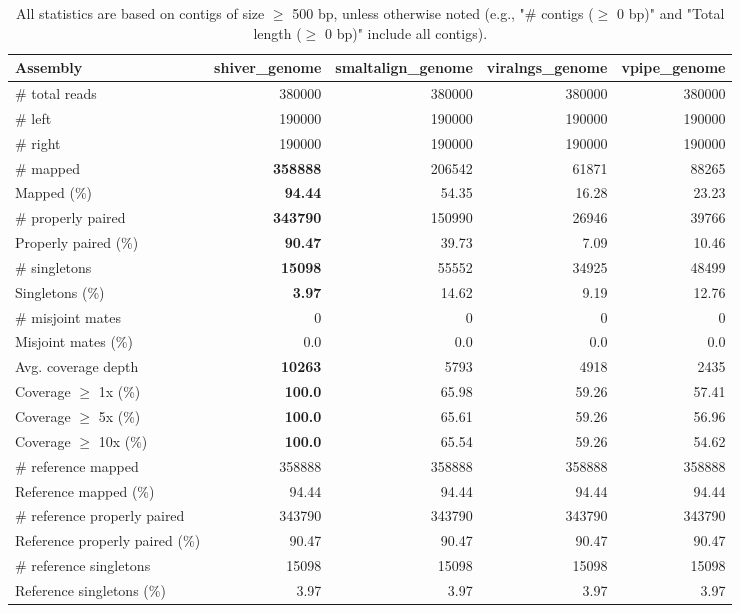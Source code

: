 \documentclass[12pt,a4paper]{article}
\begin{document}
\begin{table}[ht]
\begin{center}
\caption{All statistics are based on contigs of size $\geq$ 500 bp, unless otherwise noted (e.g., "\# contigs ($\geq$ 0 bp)" and "Total length ($\geq$ 0 bp)" include all contigs).}
\begin{tabular}{|l*{4}{|r}|}
\hline
Assembly & shiver\_genome & smaltalign\_genome & viralngs\_genome & vpipe\_genome \\ \hline
\# total reads & 380000 & 380000 & 380000 & 380000 \\ \hline
\# left & 190000 & 190000 & 190000 & 190000 \\ \hline
\# right & 190000 & 190000 & 190000 & 190000 \\ \hline
\# mapped & {\bf 358888} & 206542 & 61871 & 88265 \\ \hline
Mapped (\%) & {\bf 94.44} & 54.35 & 16.28 & 23.23 \\ \hline
\# properly paired & {\bf 343790} & 150990 & 26946 & 39766 \\ \hline
Properly paired (\%) & {\bf 90.47} & 39.73 & 7.09 & 10.46 \\ \hline
\# singletons & {\bf 15098} & 55552 & 34925 & 48499 \\ \hline
Singletons (\%) & {\bf 3.97} & 14.62 & 9.19 & 12.76 \\ \hline
\# misjoint mates & 0 & 0 & 0 & 0 \\ \hline
Misjoint mates (\%) & 0.0 & 0.0 & 0.0 & 0.0 \\ \hline
Avg. coverage depth & {\bf 10263} & 5793 & 4918 & 2435 \\ \hline
Coverage $\geq$ 1x (\%) & {\bf 100.0} & 65.98 & 59.26 & 57.41 \\ \hline
Coverage $\geq$ 5x (\%) & {\bf 100.0} & 65.61 & 59.26 & 56.96 \\ \hline
Coverage $\geq$ 10x (\%) & {\bf 100.0} & 65.54 & 59.26 & 54.62 \\ \hline
\# reference mapped & 358888 & 358888 & 358888 & 358888 \\ \hline
Reference mapped (\%) & 94.44 & 94.44 & 94.44 & 94.44 \\ \hline
\# reference properly paired & 343790 & 343790 & 343790 & 343790 \\ \hline
Reference properly paired (\%) & 90.47 & 90.47 & 90.47 & 90.47 \\ \hline
\# reference singletons & 15098 & 15098 & 15098 & 15098 \\ \hline
Reference singletons (\%) & 3.97 & 3.97 & 3.97 & 3.97 \\ \hline

\end{tabular}
\end{center}
\end{table}
\end{document}

